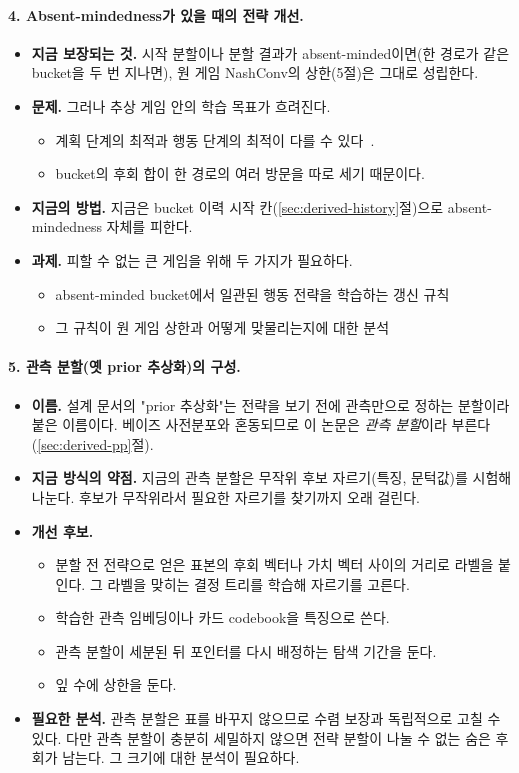 \paragraph{4. Absent-mindedness가 있을 때의 전략 개선.}
\begin{itemize}
  \item \textbf{지금 보장되는 것.} 시작 분할이나 분할 결과가 absent-minded이면(한 경로가 같은 bucket을 두 번 지나면), 원 게임 NashConv의 상한(5절)은 그대로 성립한다.
  \item \textbf{문제.} 그러나 추상 게임 안의 학습 목표가 흐려진다.
    \begin{itemize}
      \item 계획 단계의 최적과 행동 단계의 최적이 다를 수 있다~\citep{piccione1997interpretation}.
      \item bucket의 후회 합이 한 경로의 여러 방문을 따로 세기 때문이다.
    \end{itemize}
  \item \textbf{지금의 방법.} 지금은 bucket 이력 시작 칸(\ref{sec:derived-history}절)으로 absent-mindedness 자체를 피한다.
  \item \textbf{과제.} 피할 수 없는 큰 게임을 위해 두 가지가 필요하다.
    \begin{itemize}
      \item absent-minded bucket에서 일관된 행동 전략을 학습하는 갱신 규칙
      \item 그 규칙이 원 게임 상한과 어떻게 맞물리는지에 대한 분석
    \end{itemize}
\end{itemize}

\paragraph{5. 관측 분할(옛 prior 추상화)의 구성.}
\begin{itemize}
  \item \textbf{이름.} 설계 문서의 "prior 추상화"는 전략을 보기 전에 관측만으로 정하는 분할이라 붙은 이름이다. 베이즈 사전분포와 혼동되므로 이 논문은 \emph{관측 분할}이라 부른다(\ref{sec:derived-pp}절).
  \item \textbf{지금 방식의 약점.} 지금의 관측 분할은 무작위 후보 자르기(특징, 문턱값)를 시험해 나눈다. 후보가 무작위라서 필요한 자르기를 찾기까지 오래 걸린다.
  \item \textbf{개선 후보.}
    \begin{itemize}
      \item 분할 전 전략으로 얻은 표본의 후회 벡터나 가치 벡터 사이의 거리로 라벨을 붙인다. 그 라벨을 맞히는 결정 트리를 학습해 자르기를 고른다.
      \item 학습한 관측 임베딩이나 카드 codebook을 특징으로 쓴다.
      \item 관측 분할이 세분된 뒤 포인터를 다시 배정하는 탐색 기간을 둔다.
      \item 잎 수에 상한을 둔다.
    \end{itemize}
  \item \textbf{필요한 분석.} 관측 분할은 표를 바꾸지 않으므로 수렴 보장과 독립적으로 고칠 수 있다. 다만 관측 분할이 충분히 세밀하지 않으면 전략 분할이 나눌 수 없는 숨은 후회가 남는다. 그 크기에 대한 분석이 필요하다.
\end{itemize}

